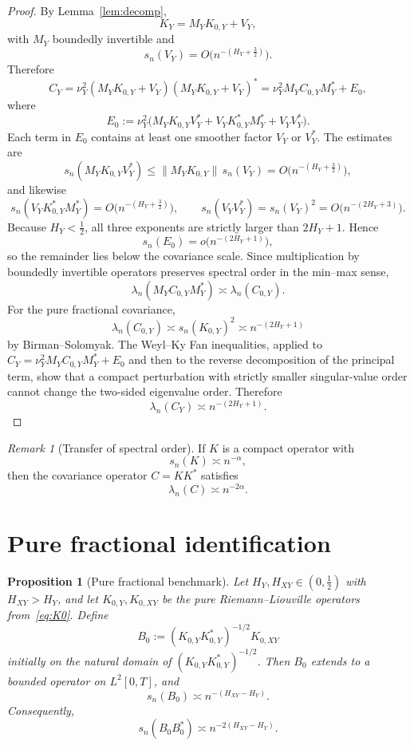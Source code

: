 \documentclass[11pt,a4paper]{amsart}
\theoremstyle{plain}
\newtheorem{proposition}[theorem]{Proposition}
\theoremstyle{definition}
\theoremstyle{remark}
\newtheorem{remark}[theorem]{Remark}
\begin{document}
\begin{proof}
By Lemma~\ref{lem:decomp},
\[
K_Y=M_YK_{0,Y}+V_Y,
\]
with $M_Y$ boundedly invertible and
\[
s_n(V_Y)=O\bigl(n^{-(H_Y+\frac32)}\bigr).
\]
Therefore
\[
C_Y
=\nu_Y^2(M_YK_{0,Y}+V_Y)(M_YK_{0,Y}+V_Y)^*
=\nu_Y^2M_YC_{0,Y}M_Y^*+E_0,
\]
where
\[
E_0:=\nu_Y^2\bigl(M_YK_{0,Y}V_Y^*+V_YK_{0,Y}^*M_Y^*+V_YV_Y^*\bigr).
\]
Each term in $E_0$ contains at least one smoother factor $V_Y$ or $V_Y^*$.  The estimates are
\[
s_n(M_YK_{0,Y}V_Y^*)\le \|M_YK_{0,Y}\|\,s_n(V_Y)=O\bigl(n^{-(H_Y+\frac32)}\bigr),
\]
and likewise
\[
s_n(V_YK_{0,Y}^*M_Y^*)=O\bigl(n^{-(H_Y+\frac32)}\bigr),
\qquad
s_n(V_YV_Y^*)=s_n(V_Y)^2=O\bigl(n^{-(2H_Y+3)}\bigr).
\]
Because \(H_Y<\tfrac12\), all three exponents are strictly larger than \(2H_Y+1\). Hence
\[
s_n(E_0)=o\bigl(n^{-(2H_Y+1)}\bigr),
\]
so the remainder lies below the covariance scale. Since multiplication by boundedly invertible
operators preserves spectral order in the min--max sense,
\[
\lambda_n(M_YC_{0,Y}M_Y^*)\asymp \lambda_n(C_{0,Y}).
\]
For the pure fractional covariance,
\[
\lambda_n(C_{0,Y})\asymp s_n(K_{0,Y})^2\asymp n^{-(2H_Y+1)}
\]
by Birman--Solomyak. The Weyl--Ky Fan inequalities, applied to
\(C_Y=\nu_Y^2M_YC_{0,Y}M_Y^*+E_0\) and then to the reverse decomposition of the principal term,
show that a compact perturbation with strictly smaller singular-value order cannot change the
two-sided eigenvalue order. Therefore
\[
\lambda_n(C_Y)\asymp n^{-(2H_Y+1)}.
\]
\end{proof}

\begin{remark}[Transfer of spectral order]
If $K$ is a compact operator with
\[
s_n(K)\asymp n^{-\alpha},
\]
then the covariance operator $C=KK^*$ satisfies
\[
\lambda_n(C)\asymp n^{-2\alpha}.
\]
\end{remark}

\section{Pure fractional identification}\label{sec:fracid}

\begin{proposition}[Pure fractional benchmark]\label{prop:fracid}
Let $H_Y,H_{XY}\in(0,\tfrac12)$ with $H_{XY}>H_Y$, and let $K_{0,Y},K_{0,XY}$ be the pure Riemann--Liouville operators from~\eqref{eq:K0}. Define
\[
B_0:=(K_{0,Y}K_{0,Y}^*)^{-1/2}K_{0,XY}
\]
initially on the natural domain of $(K_{0,Y}K_{0,Y}^*)^{-1/2}$. Then $B_0$ extends to a bounded operator on $L^2[0,T]$, and
\[
s_n(B_0)\asymp n^{-(H_{XY}-H_Y)}.
\]
Consequently,
\[
s_n(B_0B_0^*)\asymp n^{-2(H_{XY}-H_Y)}.
\]
\end{proposition}
\end{document}

